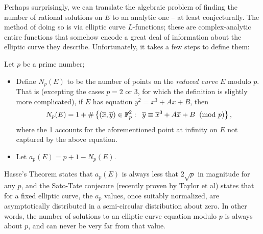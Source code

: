 \documentclass[10pt]{article}
\newcommand{\xbar}{\overline{x}}
\newcommand{\ybar}{\overline{y}}
\begin{document}
Perhaps surprisingly, we can translate the algebraic problem of finding the number of rational solutions on $E$ to an analytic one -- at least conjecturally. The method of doing so is via elliptic curve $L$-functions; these are complex-analytic entire functions that somehow encode a great deal of information about the elliptic curve they describe. Unfortunately, it takes a few steps to define them:

\begin{definition}
Let $p$ be a prime number;
\begin{itemize}
\item Define $N_p(E)$ to be the number of points on the {\it reduced curve} $E$ modulo $p$. That is (excepting the cases $p=2$ or $3$, for which the definition is slightly more complicated), if $E$ has equation $y^2 = x^3 + Ax+B$, then
\begin{equation}
N_p(E) = 1 + \#\set{(\xbar,\ybar) \in \Fp^2 : \;\; \ybar \equiv \xbar^3 + A\xbar + B \;\;(\text{mod }p)},
\end{equation}
where the 1 accounts for the aforementioned point at infinity on $E$ not captured by the above equation.
\item Let $a_p(E) = p+1 - N_p(E)$.
\end{itemize}
\end{definition}
Hasse's Theorem states that $a_p(E)$ is always less that $2\sqrt{p}$ in magnitude for any $p$, and the Sato-Tate conjecure (recently proven by Taylor et al) states that for a fixed elliptic curve, the $a_p$ values, once suitably normalized, are asymptotically distributed in a semi-circular distribution about zero. In other words, the number of solutions to an elliptic curve equation modulo $p$ is always about $p$, and can never be very far from that value.
\end{document}
